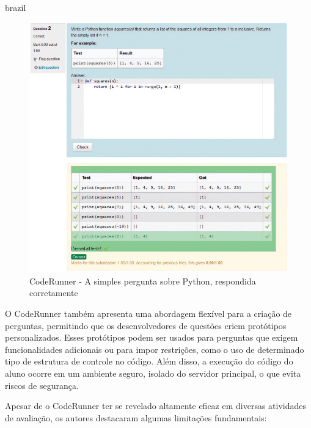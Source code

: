 \begin{otherlanguage*}{brazil}
\begin{figure}[h!]
	   \centering
            \caption{CodeRunner - A simples pergunta sobre Python, respondida corretamente}
            \label{fig:ModeloConceitual}
	   	\includegraphics[scale=0.4]{pictures/CodeRunner_correta.png}
\end{figure}

O CodeRunner também apresenta uma abordagem flexível para a criação de perguntas, permitindo que os desenvolvedores de questões criem protótipos personalizados. Esses protótipos podem ser usados para perguntas que exigem funcionalidades adicionais ou para impor restrições, como o uso de determinado tipo de estrutura de controle no código. Além disso, a execução do código do aluno ocorre em um ambiente seguro, isolado do servidor principal, o que evita riscos de segurança.

Apesar de o CodeRunner ter se revelado altamente eficaz em diversas atividades de avaliação, os autores destacaram algumas limitações fundamentais:


\end{otherlanguage*}
